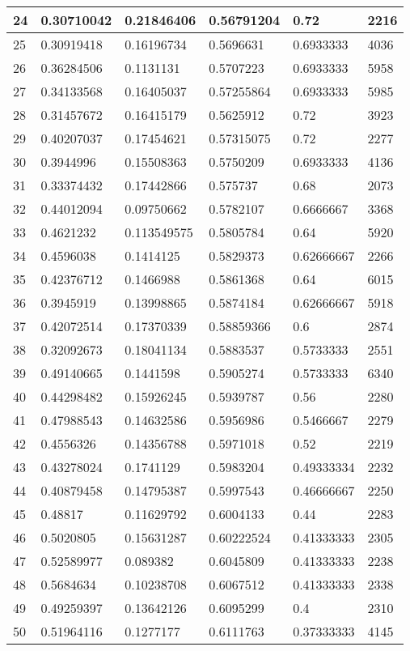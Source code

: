 \begin{longtable}{|l|l|l|l|l|l|}
24 & 0.30710042 & 0.21846406 & 0.56791204 & 0.72 & 2216 \\ \hline 
25 & 0.30919418 & 0.16196734 & 0.5696631 & 0.6933333 & 4036 \\ \hline 
26 & 0.36284506 & 0.1131131 & 0.5707223 & 0.6933333 & 5958 \\ \hline 
27 & 0.34133568 & 0.16405037 & 0.57255864 & 0.6933333 & 5985 \\ \hline 
28 & 0.31457672 & 0.16415179 & 0.5625912 & 0.72 & 3923 \\ \hline 
29 & 0.40207037 & 0.17454621 & 0.57315075 & 0.72 & 2277 \\ \hline 
30 & 0.3944996 & 0.15508363 & 0.5750209 & 0.6933333 & 4136 \\ \hline 
31 & 0.33374432 & 0.17442866 & 0.575737 & 0.68 & 2073 \\ \hline 
32 & 0.44012094 & 0.09750662 & 0.5782107 & 0.6666667 & 3368 \\ \hline 
33 & 0.4621232 & 0.113549575 & 0.5805784 & 0.64 & 5920 \\ \hline 
34 & 0.4596038 & 0.1414125 & 0.5829373 & 0.62666667 & 2266 \\ \hline 
35 & 0.42376712 & 0.1466988 & 0.5861368 & 0.64 & 6015 \\ \hline 
36 & 0.3945919 & 0.13998865 & 0.5874184 & 0.62666667 & 5918 \\ \hline 
37 & 0.42072514 & 0.17370339 & 0.58859366 & 0.6 & 2874 \\ \hline 
38 & 0.32092673 & 0.18041134 & 0.5883537 & 0.5733333 & 2551 \\ \hline 
39 & 0.49140665 & 0.1441598 & 0.5905274 & 0.5733333 & 6340 \\ \hline 
40 & 0.44298482 & 0.15926245 & 0.5939787 & 0.56 & 2280 \\ \hline 
41 & 0.47988543 & 0.14632586 & 0.5956986 & 0.5466667 & 2279 \\ \hline 
42 & 0.4556326 & 0.14356788 & 0.5971018 & 0.52 & 2219 \\ \hline 
43 & 0.43278024 & 0.1741129 & 0.5983204 & 0.49333334 & 2232 \\ \hline 
44 & 0.40879458 & 0.14795387 & 0.5997543 & 0.46666667 & 2250 \\ \hline 
45 & 0.48817 & 0.11629792 & 0.6004133 & 0.44 & 2283 \\ \hline 
46 & 0.5020805 & 0.15631287 & 0.60222524 & 0.41333333 & 2305 \\ \hline 
47 & 0.52589977 & 0.089382 & 0.6045809 & 0.41333333 & 2238 \\ \hline 
48 & 0.5684634 & 0.10238708 & 0.6067512 & 0.41333333 & 2338 \\ \hline 
49 & 0.49259397 & 0.13642126 & 0.6095299 & 0.4 & 2310 \\ \hline 
50 & 0.51964116 & 0.1277177 & 0.6111763 & 0.37333333 & 4145 \\ \hline 
\end{longtable}
